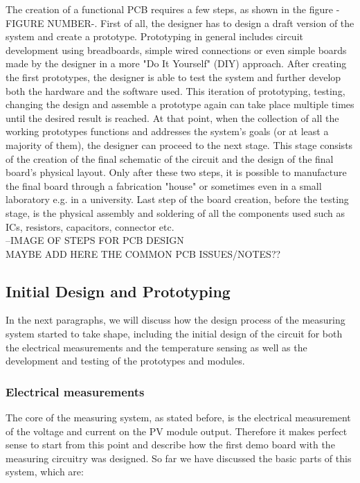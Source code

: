 The creation of a functional PCB requires a few steps, as shown in the figure -FIGURE NUMBER-. First of all, the designer has to design a draft version of the system and create a prototype. Prototyping in general includes circuit development using breadboards, simple wired connections or even simple boards made by the designer in a more "Do It Yourself" (DIY) approach. After creating the first prototypes, the designer is able to test the system and further develop both the hardware and the software used. This iteration of prototyping, testing, changing the design and assemble a prototype again can take place multiple times until the desired result is reached. At that point, when the collection of all the working prototypes functions and addresses the system's goals (or at least a majority of them), the designer can proceed to the next stage. This stage consists of the creation of the final schematic of the circuit and the design of the final board's physical layout. Only after these two steps, it is possible to manufacture the final board through a fabrication "house" or sometimes even in a small laboratory e.g. in a university. Last step of the board creation, before the testing stage, is the physical assembly and soldering of all the components used such as ICs, resistors, capacitors, connector etc.\\

--IMAGE OF STEPS FOR PCB DESIGN\\

MAYBE ADD HERE THE COMMON PCB ISSUES/NOTES??\\

\subsection{Initial Design and Prototyping}
In the next paragraphs, we will discuss how the design process of the measuring system started to take shape, including the initial design of the circuit for both the electrical measurements and the temperature sensing as well as the development and testing of the prototypes and modules. 

\subsubsection{Electrical measurements}
The core of the measuring system, as stated before, is the electrical measurement of the voltage and current on the PV module output. Therefore it makes perfect sense to start from this point and describe how the first demo board with the measuring circuitry was designed. So far we have discussed the basic parts of this system, which are:


